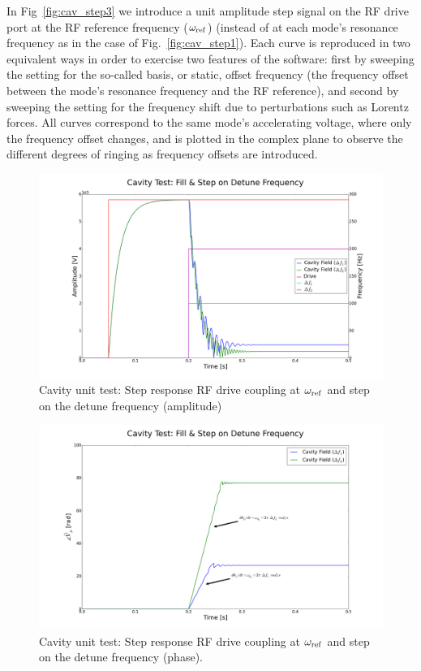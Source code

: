 \documentclass[a4paper,12pt]{article}
\begin{document}
In Fig~\ref{fig:cav_step3} we introduce a unit amplitude step signal on the RF drive port at the RF reference frequency ($\omega_{\rm ref}$) (instead of at each mode's resonance frequency as in the case of Fig.~\ref{fig:cav_step1}). Each curve is reproduced in two equivalent ways in order to exercise two features of the software: first by sweeping the setting for the so-called basis, or static, offset frequency (the frequency offset between the mode's resonance frequency and the RF reference), and second by sweeping the setting for the frequency shift due to perturbations such as Lorentz forces. All curves correspond to the same mode's accelerating voltage, where only the frequency offset changes, and is plotted in the complex plane to observe the different degrees of ringing as frequency offsets are introduced.

\begin{figure}
\centering
\includegraphics[scale=0.24]{../figures/cavity_test_detune.png}
\caption{Cavity unit test: Step response RF drive coupling at $\omega_{\rm ref}$ and step on the detune frequency (amplitude)}
\label{fig:cav_step4}
\end{figure}

\begin{figure}
\centering
\includegraphics[scale=0.26]{../figures/cavity_test_detune_phase.png}
\caption{Cavity unit test: Step response RF drive coupling at $\omega_{\rm ref}$ and step on the detune frequency (phase).}
\label{fig:cav_step5}
\end{figure}
\end{document}
